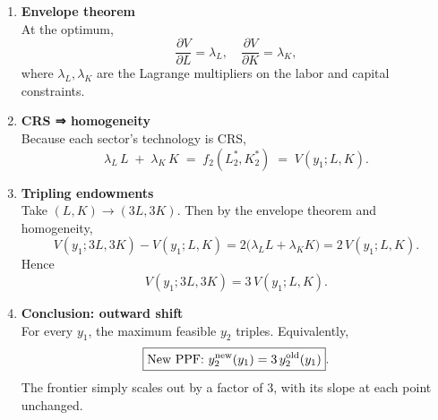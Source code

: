 \documentclass[
]{article}
\begin{document}
\begin{enumerate}
\def\labelenumi{\arabic{enumi}.}
\item
  \textbf{Envelope theorem}\\
  At the optimum, \[
  \frac{\partial V}{\partial L}
  = \lambda_{L},
  \quad
  \frac{\partial V}{\partial K}
  = \lambda_{K},
  \] where \(\lambda_{L},\lambda_{K}\) are the Lagrange multipliers on
  the labor and capital constraints.
\item
  \textbf{CRS ⇒ homogeneity}\\
  Because each sector's technology is CRS, \[
  \lambda_{L}\,L \;+\;\lambda_{K}\,K
  \;=\;
  f_{2}(L_{2}^{*},K_{2}^{*})
  \;=\;
  V(y_{1};L,K).
  \]
\item
  \textbf{Tripling endowments}\\
  Take \((L,K)\to(3L,3K)\). Then by the envelope theorem and
  homogeneity, \[
  V(y_{1};3L,3K)
  -V(y_{1};L,K)
  =2\bigl(\lambda_{L}L+\lambda_{K}K\bigr)
  =2\,V(y_{1};L,K).
  \] Hence \[
    V(y_{1};3L,3K)
    =3\,V(y_{1};L,K).
  \]
\item
  \textbf{Conclusion: outward shift}\\
  For every \(y_{1}\), the maximum feasible \(y_{2}\) triples.
  Equivalently, \[
    \boxed{
      \text{New PPF: }
      y_{2}^{\rm new}(y_{1})
      =3\,y_{2}^{\rm old}(y_{1})
    }.
  \] The frontier simply scales out by a factor of 3, with its slope at
  each point unchanged.
\end{enumerate}
\end{document}
